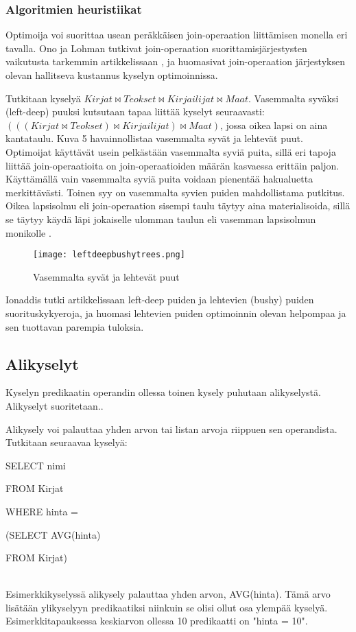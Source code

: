\documentclass[finnish]{tktltiki2}
\theoremstyle{definition}
\theoremstyle{remark}
\begin{document}
\subsubsection{Algoritmien heuristiikat}
Optimoija voi suorittaa usean peräkkäisen join-operaation liittämisen monella eri tavalla. Ono ja Lohman tutkivat join-operaation suorittamisjärjestysten vaikutusta tarkemmin artikkelissaan \cite{ono1990}, ja huomasivat join-operaation järjestyksen olevan hallitseva kustannus kyselyn optimoinnissa. 

Tutkitaan kyselyä $Kirjat \Join Teokset \Join Kirjailijat \Join Maat$. Vasemmalta syväksi (left-deep) puuksi kutsutaan tapaa liittää kyselyt seuraavasti: $(((Kirjat \Join Teokset) \Join Kirjailijat) \Join Maat)$, jossa oikea lapsi on aina kantataulu. Kuva 5 havainnollistaa vasemmalta syvät ja lehtevät puut. Optimoijat käyttävät usein pelkästään vasemmalta syviä puita, sillä eri tapoja liittää join-operaatioita on join-operaatioiden määrän kasvaessa erittäin paljon. Käyttämällä vain vasemmalta syviä puita voidaan pienentää hakualuetta merkittävästi. \cite{left-deeppejä tutkiva artikkeli} Toinen syy on vasemmalta syvien puiden mahdollistama putkitus. Oikea lapsisolmu eli join-operaation sisempi taulu täytyy aina materialisoida, sillä se täytyy käydä läpi jokaiselle ulomman taulun eli vasemman lapsisolmun monikolle \cite{ramakrishnan2003database}. 

\begin{figure}[!h]
  \caption{Vasemmalta syvät ja lehtevät puut}
  \centering
    \texttt{[image: leftdeepbushytrees.png]}
\end{figure}

Ionaddis tutki artikkelissaan \cite{ioannidis1991left} left-deep puiden ja lehtevien (bushy) puiden suorituskykyeroja, ja huomasi lehtevien puiden optimoinnin olevan helpompaa ja sen tuottavan parempia tuloksia. 

\subsection{Alikyselyt}

Kyselyn predikaatin operandin ollessa toinen kysely puhutaan alikyselystä. Alikyselyt suoritetaan..

Alikysely voi palauttaa yhden arvon tai listan arvoja riippuen sen operandista. Tutkitaan seuraavaa kyselyä:

\newline

\begin{frame}

SELECT nimi

FROM Kirjat

WHERE hinta = 

(SELECT AVG(hinta)
		
FROM Kirjat)
\end{frame}
\\\newline
Esimerkkikyselyssä alikysely palauttaa yhden arvon, AVG(hinta). Tämä arvo lisätään ylikyselyyn predikaatiksi niinkuin se olisi ollut osa ylempää kyselyä. Esimerkkitapauksessa keskiarvon ollessa 10 predikaatti on "hinta = 10".
\end{document}
